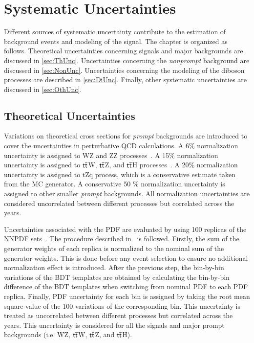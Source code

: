\chapter{Systematic Uncertainties}
\label{chap:Systematics}

Different sources of systematic uncertainty contribute to the estimation of background events and modeling of the signal. The chapter is organized as follows. Theoretical uncertainties concerning signals and major backgrounds are discussed in \autoref{sec:ThUnc}. Uncertainties concerning the \emph{nonprompt} background are discussed in \autoref{sec:NonUnc}. Uncertainties concerning the modeling of the diboson processes are described in \autoref{sec:DiUnc}. Finally, other systematic uncertainties are discussed in \autoref{sec:OthUnc}.

\section{Theoretical Uncertainties}
\label{sec:ThUnc}

Variations on theoretical cross sections for \emph{prompt} backgrounds are introduced to cover the uncertainties in perturbative \ac{QCD} calculations. A 6$\%$ normalization uncertainty is assigned to WZ and ZZ processes~\cite{Campbell:2011bn}. A 15$\%$ normalization uncertainty is assigned to $\textsf{t}\overline{\textsf{t}}$W, $\textsf{t}\overline{\textsf{t}}$Z, and $\textsf{t}\overline{\textsf{t}}$H processes~\cite{Frederix:2021agh,Kulesza:2020nfh}. A 20$\%$ normalization uncertainty is assigned to tZq process, which is a conservative estimate taken from the MC generator. A conservative 50 $\%$ normalization uncertainty is assigned to other smaller \emph{prompt} backgrounds. All normalization uncertainties are considered uncorrelated between different processes but correlated across the years. 

Uncertainties associated with the \ac{PDF} are evaluated by using 100 replicas of the NNPDF sets~\cite{NNPDF:2014otw,NNPDF:2017mvq}. The procedure described in~\cite{CMS:2012nsv} is followed. Firstly, the sum of the generator weights of each replica is normalized to the nominal sum of the generator weights. This is done before any event selection to ensure no additional normalization effect is introduced. After the previous step, the bin-by-bin variations of the \ac{BDT} templates are obtained by calculating the bin-by-bin difference of the \ac{BDT} templates when switching from nominal \ac{PDF} to each \ac{PDF} replica. Finally, \ac{PDF} uncertainty for each bin is assigned by taking the root mean square value of the 100 variations of the corresponding bin. This uncertainty is treated as uncorrelated between different processes but correlated across the years. This uncertainty is considered for all the signals and major prompt backgrounds (i.e. WZ, $\textsf{t}\overline{\textsf{t}}$W, $\textsf{t}\overline{\textsf{t}}$Z, and $\textsf{t}\overline{\textsf{t}}$H).

